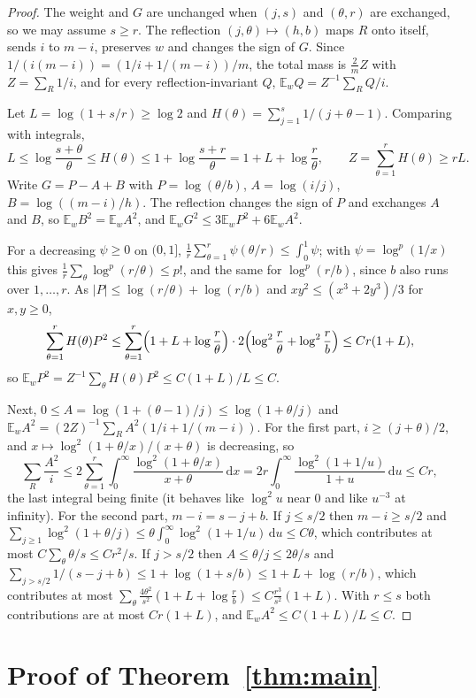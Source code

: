 \documentclass[11pt]{amsart}
\theoremstyle{remark}
\numberwithin{equation}{section}
\newcommand{\E}{\mathbb E}
\newcommand{\dd}{\,\mathrm d}
\begin{document}
\begin{proof}
The weight and $G$ are unchanged when $(j,s)$ and $(\theta,r)$ are exchanged, so we may assume $s\ge r$. The reflection $(j,\theta)\mapsto(h,b)$ maps $R$ onto itself, sends $i$ to $m-i$, preserves $w$ and changes the sign of $G$. Since $1/(i(m-i))=(1/i+1/(m-i))/m$, the total mass is $\frac2m Z$ with $Z=\sum_R1/i$, and for every reflection-invariant $Q$, $\E_wQ=Z^{-1}\sum_RQ/i$.

Let $L=\log(1+s/r)\ge\log2$ and $H(\theta)=\sum_{j=1}^s1/(j+\theta-1)$. Comparing with integrals,
\[
L\le\log\frac{s+\theta}\theta\le H(\theta)\le1+\log\frac{s+r}\theta=1+L+\log\frac r\theta,\qquad Z=\sum_{\theta=1}^rH(\theta)\ge rL .
\]
Write $G=P-A+B$ with $P=\log(\theta/b)$, $A=\log(i/j)$, $B=\log((m-i)/h)$. The reflection changes the sign of $P$ and exchanges $A$ and $B$, so $\E_wB^2=\E_wA^2$, and $\E_wG^2\le3\E_wP^2+6\E_wA^2$.

For a decreasing $\psi\ge0$ on $(0,1]$, $\frac1r\sum_{\theta=1}^r\psi(\theta/r)\le\int_0^1\psi$; with $\psi=\log^p(1/x)$ this gives $\frac1r\sum_\theta\log^p(r/\theta)\le p!$, and the same for $\log^p(r/b)$, since $b$ also runs over $1,\dots,r$. As $|P|\le\log(r/\theta)+\log(r/b)$ and $xy^2\le(x^3+2y^3)/3$ for $x,y\ge0$,
\[
\sum_{\theta=1}^rH(\theta)P^2\le\sum_{\theta=1}^r\Bigl(1+L+\log\frac r\theta\Bigr)\cdot2\Bigl(\log^2\frac r\theta+\log^2\frac rb\Bigr)\le Cr(1+L),
\]
so $\E_wP^2=Z^{-1}\sum_\theta H(\theta)P^2\le C(1+L)/L\le C$.

Next, $0\le A=\log(1+(\theta-1)/j)\le\log(1+\theta/j)$ and $\E_wA^2=(2Z)^{-1}\sum_RA^2(1/i+1/(m-i))$. For the first part, $i\ge(j+\theta)/2$, and $x\mapsto\log^2(1+\theta/x)/(x+\theta)$ is decreasing, so
\[
\sum_R\frac{A^2}i\le2\sum_{\theta=1}^r\int_0^\infty\frac{\log^2(1+\theta/x)}{x+\theta}\dd x=2r\int_0^\infty\frac{\log^2(1+1/u)}{1+u}\dd u\le Cr ,
\]
the last integral being finite (it behaves like $\log^2u$ near $0$ and like $u^{-3}$ at infinity). For the second part, $m-i=s-j+b$. If $j\le s/2$ then $m-i\ge s/2$ and $\sum_{j\ge1}\log^2(1+\theta/j)\le\theta\int_0^\infty\log^2(1+1/u)\dd u\le C\theta$, which contributes at most $C\sum_\theta\theta/s\le Cr^2/s$. If $j>s/2$ then $A\le\theta/j\le2\theta/s$ and $\sum_{j>s/2}1/(s-j+b)\le1+\log(1+s/b)\le1+L+\log(r/b)$, which contributes at most $\sum_\theta\frac{4\theta^2}{s^2}(1+L+\log\frac rb)\le C\frac{r^3}{s^2}(1+L)$. With $r\le s$ both contributions are at most $Cr(1+L)$, and $\E_wA^2\le C(1+L)/L\le C$.
\end{proof}

\section{Proof of Theorem~\ref{thm:main}}\label{sec:proof}
\end{document}
